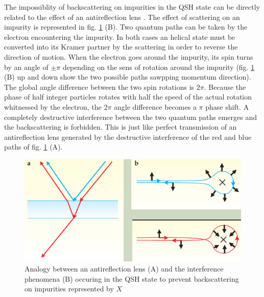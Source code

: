 The impossiblity of backscattering on impurities in the QSH state can be directly related to the effect of an antireflection lens \cite{qi_quantum_2010}. The effect of scattering on an impurity is represented in fig. \ref{lens} (B). Two quantum paths can be taken by the electron encountering the impurity. In both cases an helical state must be converted into its Kramer partner by the scattering in order to reverse the direction of motion. When the electron goes around the impurity, its spin turns by an angle of $\pm \pi$ depending on the sens of rotation around the impurity (fig. \ref{lens} (B) up and down show the two possible paths sawpping momentum direction). The global angle difference between the two spin rotations is $2\pi$. Because the phase of half integer particles rotates with half the speed of the actual rotation whitnessed by the electron, the $2\pi$ angle difference becomes a $\pi$ phase shift. A completely destructive interference between the two quantum paths emerges \cite{barut_path_1992} and the backscattering is forbidden. This is just like perfect transmission of an antireflection lens generated by the destructive interference of the red and blue paths of fig. \ref{lens} (A). 


\begin{figure}[t]
    \includegraphics[width=\columnwidth]{sections/visuel/lens.png}
    \caption{Analogy between an antireflection lens (A) and the interference phenomena (B) occuring in the QSH state to prevent backscattering on impurities represented by $X$ \cite{qi_quantum_2010}}
    \label{lens}
\end{figure}




